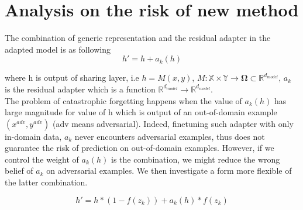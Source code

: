 \documentclass[12pt,a4paper,twoside]{report}
\theoremstyle{definition}
\begin{document}
\section*{Analysis on the risk of new method}

The combination of generic representation and the residual adapter in the adapted model is as following
\begin{equation}
h' = h + a_k(h)
\label{eq:1}
\end{equation}

where h is output of sharing layer, i.e $h=M(x,y)$, $M: \mathbb{X} \times \mathbb{Y} \rightarrow \mathbf{\Omega}\subset \mathbb{R}^{d_{model}}$, $a_k$ is the residual adapter which is a function $\mathbb{R}^{d_{model}} \rightarrow \mathbb{R}^{d_{model}}$. \\

The problem of catastrophic forgetting happens when the value of $a_k(h)$ has large magnitude for value of h which is output of an out-of-domain example $(x^{adv}, y^{adv})$ (adv means adversarial). Indeed, finetuning such adapter with only in-domain data, $a_k$ never encounters adversarial examples, thus does not guarantee the risk of prediction on out-of-domain examples. However, if we control the weight of $a_k(h)$ is the combination, we might reduce the wrong belief of $a_k$ on adversarial examples. We then investigate a form more flexible of the latter combination.

\begin{equation}
h' = h * (1-f(z_k)) + a_k(h) * f(z_k)
\label{eq:2}
\end{equation}
\end{document}
